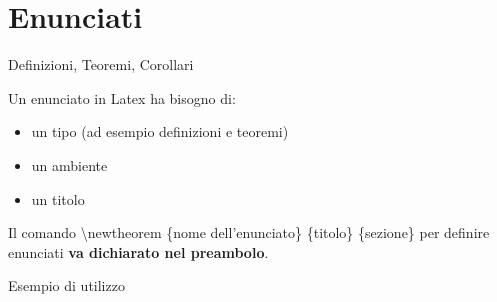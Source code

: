 \section{Enunciati}
  \begin{frame}{Definizioni, Teoremi, Corollari}

	Un enunciato in Latex ha bisogno di:

    \begin{itemize}
      \item un tipo (ad esempio definizioni e teoremi)
      \item un ambiente
	  \item un titolo
    \end{itemize}

	Il comando \textbackslash newtheorem \{nome dell'enunciato\} \{titolo\} \{sezione\} per definire enunciati \textbf{va dichiarato nel preambolo}.

    \begin{exampleblock}{Esempio di utilizzo}
	  \lstset{inputencoding=utf8/latin1}
      
    \end{exampleblock}

\end{frame}
